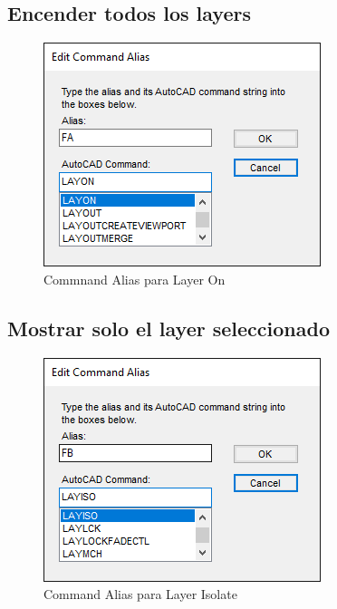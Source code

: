 \documentclass{report}
\begin{document}
\subsection{Encender todos los layers}

\begin{figure}[H]
	\centering
	\includegraphics[width=0.7\linewidth, height=0.45\textheight,keepaspectratio]{Imagenes/autocad_alias_layeroptions_02}
	\caption{Commnand Alias para Layer On}
\end{figure}

\subsection{Mostrar solo el layer seleccionado}

\begin{figure}[H]
	\centering
	\includegraphics[width=0.7\linewidth, height=0.45\textheight,keepaspectratio]{Imagenes/autocad_alias_layeroptions_03}
	\caption{Command Alias para Layer Isolate}
	\label{fig:autocadaliaslayeroptions03}
\end{figure}
\end{document}
